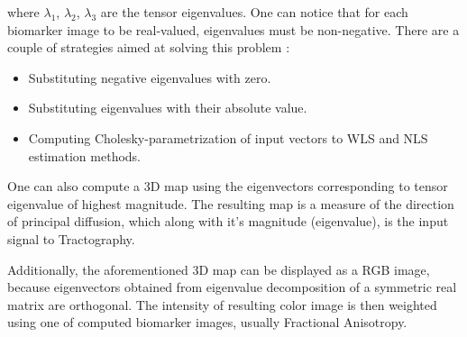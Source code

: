 where $\lambda_{1}$, $\lambda_{2}$, $\lambda_{3}$ are the tensor eigenvalues. One can notice that for each biomarker image to be real-valued, eigenvalues must be non-negative. There are a couple of strategies aimed at solving this problem \cite{m6_koay2006b}:
\begin{itemize}
	\item Substituting negative eigenvalues with zero.
	\item Substituting eigenvalues with their absolute value.
	\item Computing Cholesky-parametrization of input vectors to WLS and NLS estimation methods.
\end{itemize}

One can also compute a 3D map using the eigenvectors corresponding to tensor eigenvalue of highest magnitude. The resulting map is a measure of the direction of principal diffusion, which along with it's magnitude (eigenvalue), is the input signal to Tractography.

Additionally, the aforementioned 3D map can be displayed as a RGB image, because eigenvectors obtained from eigenvalue decomposition of a symmetric real matrix are orthogonal. The intensity of resulting color image is then weighted using one of computed biomarker images, usually Fractional Anisotropy.
